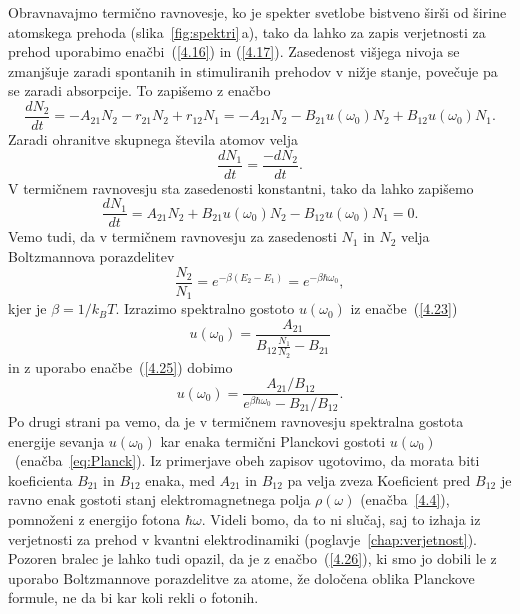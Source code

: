 Obravnavajmo termično ravnovesje, ko je spekter svetlobe bistveno širši
od širine atomskega prehoda (slika~\ref{fig:spektri}\,a), tako da lahko za zapis
verjetnosti za prehod uporabimo enačbi~(\ref{4.16}) in (\ref{4.17}). Zasedenost višjega nivoja
se zmanjšuje zaradi spontanih in stimuliranih prehodov v nižje
stanje, povečuje pa se zaradi absorpcije. To zapišemo z enačbo
\begin{equation}
\frac{dN_{2}}{dt}=-A_{21}N_2 - r_{21}N_2 + r_{12}N_1 = 
-A_{21}N_{2}-B_{21}u(\omega_{0})N_{2}+B_{12}u(\omega_{0})N_{1}.
\label{4.22}
\end{equation}
Zaradi ohranitve skupnega števila atomov velja 
\begin{equation}
\frac{dN_{1}}{dt}=\frac{-dN_{2}}{dt}.
\end{equation}
V termičnem ravnovesju sta zasedenosti konstantni, tako da lahko zapišemo 
\begin{equation}
\frac{dN_{1}}{dt}=A_{21}N_{2}+B_{21}u(\omega_{0})N_{2}-B_{12}u(\omega_{0})N_{1}=0.
\label{4.23}
\end{equation}
Vemo tudi, da v termičnem ravnovesju za zasedenosti $N_{1}$ in $N_{2}$ velja
Boltzmannova porazdelitev
\begin{equation}
\frac{N_{2}}{N_{1}}=e^{-\beta(E_{2}-E_{1})} = e^{-\beta \hbar \omega_0},
\label{4.25}
\end{equation}
kjer je $\beta=1/k_BT$. Izrazimo spektralno gostoto $u(\omega_0)$ 
iz enačbe~(\ref{4.23})
\begin{equation}
u(\omega_{0})=\frac{A_{21}}{B_{12}\frac{N_{1}}{N_{2}}-B_{21}}
\label{4.24}
\end{equation}
in z uporabo enačbe~(\ref{4.25}) dobimo
\begin{equation}
u(\omega_{0})=\frac{A_{21}/B_{12}}{e^{\beta\hbar\omega_{0}}-B_{21}/B_{12}}.
\label{4.26}
\end{equation}
Po drugi strani pa vemo, da je v termičnem ravnovesju spektralna gostota energije sevanja
$u(\omega_0)$ kar enaka termični Planckovi gostoti $u(\omega_{0})$~(enačba~\ref{eq:Planck}).
Iz primerjave obeh zapisov ugotovimo, da morata biti koeficienta $B_{21}$ in $B_{12}$ enaka,
med $A_{21}$ in $B_{12}$ pa velja zveza 
Koeficient pred $B_{12}$ je ravno enak gostoti stanj elektromagnetnega polja 
$\rho(\omega)$ (enačba~\ref{4.4}), pomnoženi z energijo fotona $\hbar\omega$. 
Videli bomo, da to ni slučaj, saj to izhaja iz verjetnosti za prehod v kvantni 
elektrodinamiki (poglavje~\ref{chap:verjetnost}).
Pozoren bralec je lahko tudi opazil, da je z enačbo~(\ref{4.26}),
ki smo jo dobili le z uporabo Boltzmannove porazdelitve za atome, že
določena oblika Planckove formule, ne da bi kar koli rekli o fotonih.

